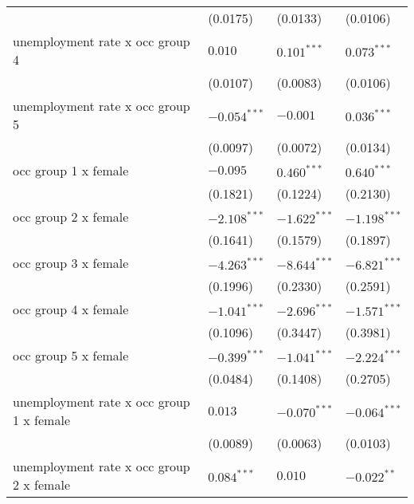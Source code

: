 \begin{tabular}{llll}
                                         &           (0.0175) &           (0.0133) &           (0.0106) \\
unemployment rate x occ group 4          &            $0.010$ &      $0.101^{***}$ &      $0.073^{***}$ \\
                                         &           (0.0107) &           (0.0083) &           (0.0106) \\
unemployment rate x occ group 5          &     $-0.054^{***}$ &           $-0.001$ &      $0.036^{***}$ \\
                                         &           (0.0097) &           (0.0072) &           (0.0134) \\
occ group 1 x female                     &           $-0.095$ &      $0.460^{***}$ &      $0.640^{***}$ \\
                                         &           (0.1821) &           (0.1224) &           (0.2130) \\
occ group 2 x female                     &     $-2.108^{***}$ &     $-1.622^{***}$ &     $-1.198^{***}$ \\
                                         &           (0.1641) &           (0.1579) &           (0.1897) \\
occ group 3 x female                     &     $-4.263^{***}$ &     $-8.644^{***}$ &     $-6.821^{***}$ \\
                                         &           (0.1996) &           (0.2330) &           (0.2591) \\
occ group 4 x female                     &     $-1.041^{***}$ &     $-2.696^{***}$ &     $-1.571^{***}$ \\
                                         &           (0.1096) &           (0.3447) &           (0.3981) \\
occ group 5 x female                     &     $-0.399^{***}$ &     $-1.041^{***}$ &     $-2.224^{***}$ \\
                                         &           (0.0484) &           (0.1408) &           (0.2705) \\
unemployment rate x occ group 1 x female &            $0.013$ &     $-0.070^{***}$ &     $-0.064^{***}$ \\
                                         &           (0.0089) &           (0.0063) &           (0.0103) \\
unemployment rate x occ group 2 x female &      $0.084^{***}$ &            $0.010$ &      $-0.022^{**}$ \\

\end{tabular}
